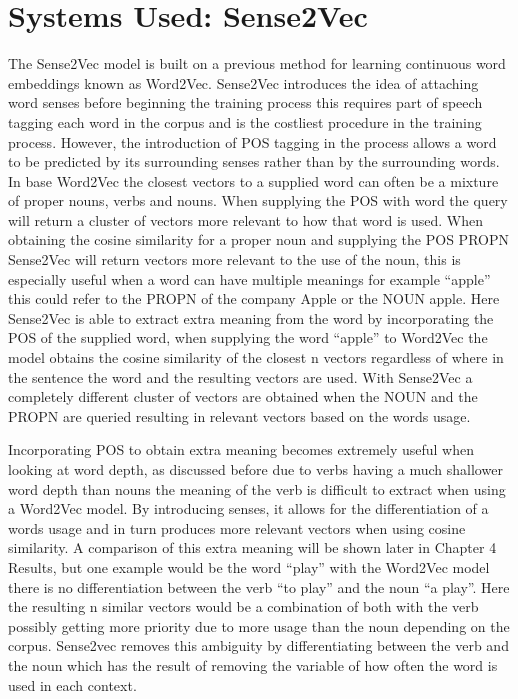 \section{Systems Used: Sense2Vec}
The Sense2Vec model is built on a previous method for learning continuous word embeddings known as Word2Vec. Sense2Vec introduces the idea of attaching word senses before beginning the training process this requires part of speech tagging each word in the corpus and is the costliest procedure in the training process. However, the introduction of POS tagging in the process allows a word to be predicted by its surrounding senses rather than by the surrounding words. In base Word2Vec the closest vectors to a supplied word can often be a mixture of proper nouns, verbs and nouns. When supplying the POS with word the query will return a cluster of vectors more relevant to how that word is used. When obtaining the cosine similarity for a proper noun and supplying the POS PROPN Sense2Vec will return vectors more relevant to the use of the noun, this is especially useful when a word can have multiple meanings for example “apple” this could refer to the PROPN of the company Apple or the NOUN apple. Here Sense2Vec is able to extract extra meaning from the word by incorporating the POS of the supplied word, when supplying the word “apple” to Word2Vec the model obtains the cosine similarity of the closest n vectors regardless of where in the sentence the word and the resulting vectors are used. With Sense2Vec a completely different cluster of vectors are obtained when the NOUN and the PROPN are queried resulting in relevant vectors based on the words usage. \cite{Trask2015}

Incorporating POS to obtain extra meaning becomes extremely useful when looking at word depth, as discussed before due to verbs having a much shallower word depth than nouns the meaning of the verb is difficult to extract when using a Word2Vec model. By introducing senses, it allows for the differentiation of a words usage and in turn produces more relevant vectors when using cosine similarity. A comparison of this extra meaning will be shown later in Chapter 4 Results, but one example would be the word “play” with the Word2Vec model there is no differentiation between the verb “to play” and the noun “a play”. Here the resulting n similar vectors would be a combination of both with the verb possibly getting more priority due to more usage than the noun depending on the corpus. Sense2vec removes this ambiguity by differentiating between the verb and the noun which has the result of removing the variable of how often the word is used in each context.


